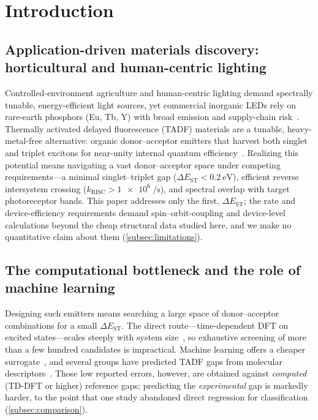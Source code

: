 
\section{Introduction}\label{sec:introduction}

\subsection{Application-driven materials discovery: horticultural and human-centric lighting}

Controlled-environment agriculture and human-centric lighting demand spectrally
tunable, energy-efficient light sources, yet commercial inorganic LEDs rely on
rare-earth phosphors (Eu, Tb, Y) with broad emission and supply-chain
risk~\cite{Yokoyama_2018, Bugbee2016}. Thermally activated delayed fluorescence
(TADF) materials are a tunable, heavy-metal-free alternative: organic
donor--acceptor emitters that harvest both singlet and triplet excitons for
near-unity internal quantum efficiency~\cite{Uoyama2012}.
Realizing this potential means navigating a vast donor--acceptor space under
competing requirements---a minimal singlet--triplet gap
($\Delta E_\text{ST} < \qty{0.2}{\electronvolt}$), efficient reverse intersystem
crossing ($k_\text{RISC} > \qty{1e6}{\per\second}$), and spectral overlap with
target photoreceptor bands. This paper addresses only the first,
$\Delta E_\text{ST}$; the rate and device-efficiency requirements demand
spin--orbit-coupling and device-level calculations beyond the cheap structural
data studied here, and we make no quantitative claim about them
(\cref{subsec:limitations}).

\subsection{The computational bottleneck and the role of machine learning}

Designing such emitters means searching a large space of donor--acceptor
combinations for a small $\Delta E_\text{ST}$. The direct route---time-dependent
DFT on excited states---scales steeply with system size~\cite{Curtarolo2013},
so exhaustive screening of more than a few hundred candidates is impractical.
Machine learning offers a cheaper surrogate~\cite{Butler2018, Pyzer-Knapp2022},
and several groups have predicted TADF gaps from molecular
descriptors~\cite{Gomez-Bombarelli2016, Barneschi2024}. Those low reported errors,
however, are obtained against \emph{computed} (TD-DFT or higher) reference gaps;
predicting the \emph{experimental} gap is markedly harder, to the point that one
study abandoned direct regression for classification~\cite{Nigam2024}
(\cref{subsec:comparison}).

